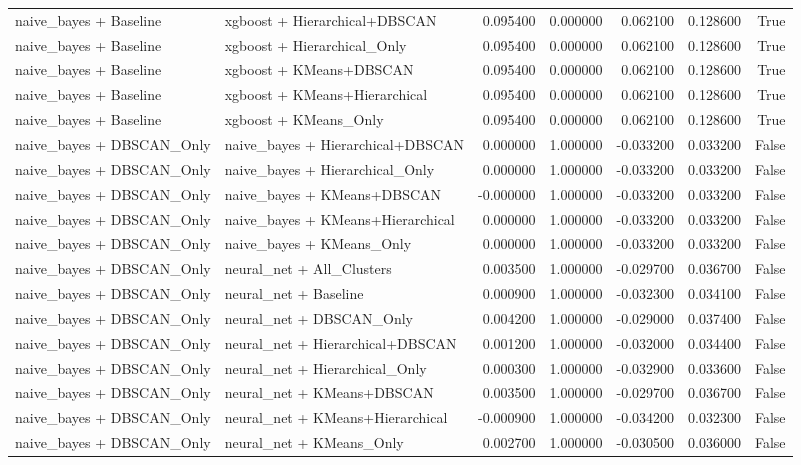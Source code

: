 \begin{tabular}{llrrrrr}
naive_bayes + Baseline & xgboost + Hierarchical+DBSCAN & 0.095400 & 0.000000 & 0.062100 & 0.128600 & True \\
naive_bayes + Baseline & xgboost + Hierarchical_Only & 0.095400 & 0.000000 & 0.062100 & 0.128600 & True \\
naive_bayes + Baseline & xgboost + KMeans+DBSCAN & 0.095400 & 0.000000 & 0.062100 & 0.128600 & True \\
naive_bayes + Baseline & xgboost + KMeans+Hierarchical & 0.095400 & 0.000000 & 0.062100 & 0.128600 & True \\
naive_bayes + Baseline & xgboost + KMeans_Only & 0.095400 & 0.000000 & 0.062100 & 0.128600 & True \\
naive_bayes + DBSCAN_Only & naive_bayes + Hierarchical+DBSCAN & 0.000000 & 1.000000 & -0.033200 & 0.033200 & False \\
naive_bayes + DBSCAN_Only & naive_bayes + Hierarchical_Only & 0.000000 & 1.000000 & -0.033200 & 0.033200 & False \\
naive_bayes + DBSCAN_Only & naive_bayes + KMeans+DBSCAN & -0.000000 & 1.000000 & -0.033200 & 0.033200 & False \\
naive_bayes + DBSCAN_Only & naive_bayes + KMeans+Hierarchical & 0.000000 & 1.000000 & -0.033200 & 0.033200 & False \\
naive_bayes + DBSCAN_Only & naive_bayes + KMeans_Only & 0.000000 & 1.000000 & -0.033200 & 0.033200 & False \\
naive_bayes + DBSCAN_Only & neural_net + All_Clusters & 0.003500 & 1.000000 & -0.029700 & 0.036700 & False \\
naive_bayes + DBSCAN_Only & neural_net + Baseline & 0.000900 & 1.000000 & -0.032300 & 0.034100 & False \\
naive_bayes + DBSCAN_Only & neural_net + DBSCAN_Only & 0.004200 & 1.000000 & -0.029000 & 0.037400 & False \\
naive_bayes + DBSCAN_Only & neural_net + Hierarchical+DBSCAN & 0.001200 & 1.000000 & -0.032000 & 0.034400 & False \\
naive_bayes + DBSCAN_Only & neural_net + Hierarchical_Only & 0.000300 & 1.000000 & -0.032900 & 0.033600 & False \\
naive_bayes + DBSCAN_Only & neural_net + KMeans+DBSCAN & 0.003500 & 1.000000 & -0.029700 & 0.036700 & False \\
naive_bayes + DBSCAN_Only & neural_net + KMeans+Hierarchical & -0.000900 & 1.000000 & -0.034200 & 0.032300 & False \\
naive_bayes + DBSCAN_Only & neural_net + KMeans_Only & 0.002700 & 1.000000 & -0.030500 & 0.036000 & False \\

\end{tabular}
